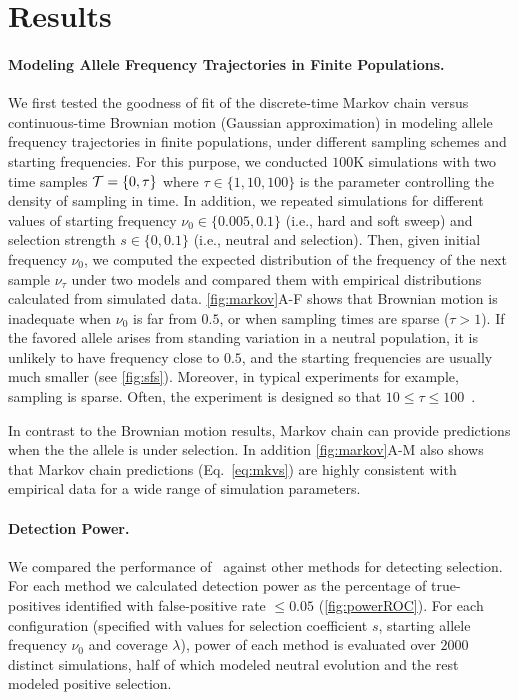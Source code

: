 \section{Results}
\paragraph{Modeling Allele Frequency Trajectories in Finite Populations.} 
We first tested the goodness of fit of the discrete-time Markov chain
versus continuous-time Brownian motion (Gaussian approximation) in modeling 
allele frequency
trajectories in finite populations, under different sampling schemes
and starting frequencies.  For this purpose, we conducted $100$K
simulations with two time samples ${\cal T}=\{0,\tau\}$ where $\tau\in
\{1,10,100\}$ is the parameter controlling the density of sampling
in time.  In addition, we repeated simulations for different values of
starting frequency $\nu_0\in\{0.005,0.1\}$ (i.e., hard and soft sweep)
and selection strength $s\in\{0,0.1\}$ (i.e., neutral and
selection). Then, given initial frequency $\nu_0$, we computed
the expected distribution of the frequency of the next sample $\nu_\tau$
under two models and compared them with empirical distributions
calculated from simulated data.  \ref{fig:markov}A-F shows that
Brownian motion is inadequate when $\nu_0$ is
far from $0.5$, or when sampling times are sparse ($\tau>1$). If the
favored allele arises from standing variation in a neutral population,
it is unlikely to have frequency close to $0.5$, and the starting
frequencies are usually much smaller (see
\ref{fig:sfs}). Moreover, in typical \dmel experiments for
example, sampling is sparse. Often, the experiment is designed so that
$10\le\tau\le100$~\cite{kofler2013guide, orozco2012adaptation,
  zhou2011experimental,franssen2015patterns}.

In contrast to the Brownian motion results,  Markov chain can provide 
predictions when the the allele is under selection. In addition 
\ref{fig:markov}A-M
also shows that Markov chain predictions (Eq.~\ref{eq:mkvs}) are
highly consistent with empirical data for a wide range of simulation
parameters.

\paragraph{Detection Power.} 
We compared the performance of \comale\ against other methods for
detecting selection. For each method we calculated detection power as the 
percentage of true-positives identified with false-positive rate $\le 0.05$
(\ref{fig:powerROC}). For each
configuration (specified with values for selection coefficient $s$,
starting allele frequency $\nu_0$ and coverage $\lambda$), power of each method 
is evaluated over $2000$ distinct simulations, half of which modeled neutral 
evolution
and the rest modeled positive selection.

